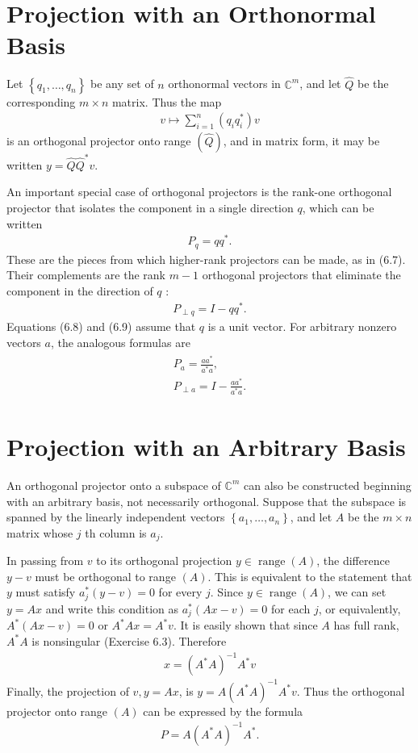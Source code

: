 \section{Projection with an Orthonormal Basis}
 Let $\left\{q_1, \ldots, q_n\right\}$ be any set of $n$ orthonormal vectors in $\mathbb{C}^m$, and let $\hat{Q}$ be the corresponding $m \times n$ matrix. Thus the map
 \begin{align}
    \label{eq: project with orthonormal basis}
 v \mapsto \sum_{i=1}^n\left(q_i q_i^*\right) v
 \end{align}
 is an orthogonal projector onto range $(\hat{Q})$, and in matrix form, it may be written $y=\hat{Q} \hat{Q}^* v$. 

 An important special case of orthogonal projectors is the rank-one orthogonal projector that isolates the component in a single direction $q$, which can be written
\begin{align*}
P_q=q q^* .
\end{align*}
These are the pieces from which higher-rank projectors can be made, as in (6.7). Their complements are the rank $m-1$ orthogonal projectors that eliminate the component in the direction of $q$ :
\begin{align*}
P_{\perp q}=I-q q^* .
\end{align*}
Equations (6.8) and (6.9) assume that $q$ is a unit vector. For arbitrary nonzero vectors $a$, the analogous formulas are
\begin{align*}
\begin{gathered}
P_a=\frac{a a^*}{a^* a}, \\
P_{\perp a}=I-\frac{a a^*}{a^* a} .
\end{gathered}
\end{align*}

\section{Projection with an Arbitrary Basis} 
An orthogonal projector onto a subspace of $\mathbb{C}^m$ can also be constructed beginning with an arbitrary basis, not necessarily orthogonal. Suppose that the subspace is spanned by the linearly independent vectors $\left\{a_1, \ldots, a_n\right\}$, and let $A$ be the $m \times n$ matrix whose $j$ th column is $a_j$.

In passing from $v$ to its orthogonal projection $y \in \operatorname{range}(A)$, the difference $y-v$ must be orthogonal to range $(A)$. This is equivalent to the statement that $y$ must satisfy $a_j^*(y-v)=0$ for every $j$. Since $y \in \operatorname{range}(A)$, we can set $y=A x$ and write this condition as $a_j^*(A x-v)=0$ for each $j$, or equivalently, $A^*(A x-v)=0$ or $A^* A x=A^* v$. It is easily shown that since $A$ has full rank, $A^* A$ is nonsingular (Exercise 6.3). Therefore
\begin{align*}
x=\left(A^* A\right)^{-1} A^* v
\end{align*}
Finally, the projection of $v, y=A x$, is $y=A\left(A^* A\right)^{-1} A^* v$. Thus the orthogonal projector onto range $(A)$ can be expressed by the formula
\begin{align*}
    P=A\left(A^* A\right)^{-1} A^*.
\end{align*}
